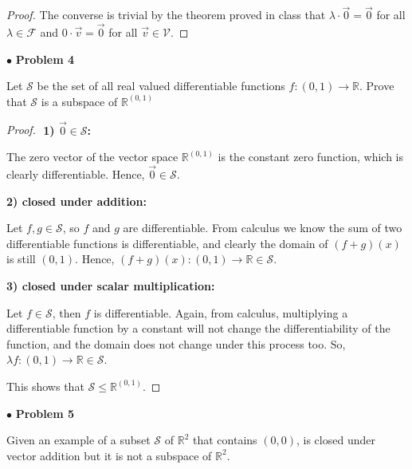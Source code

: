\documentclass{article}
\begin{document}
\begin{proof}
The converse is trivial by the theorem proved in class that $\lambda \cdot \vec{0} = \vec{0}$ for all $\lambda \in \mathcal{F}$ and $0 \cdot \vec{v} = \vec{0}$ for all $\vec{v} \in \mathcal{V}$. 

\end{proof}


\newpage
$\bullet$ \textbf{Problem 4}
\medskip

\begin{itshape}
Let $\mathcal{S}$ be the set of all real valued differentiable functions $f:(0,1) \to \mathbb{R}$. Prove that $\mathcal{S}$ is a subspace of $\mathbb{R}^{(0,1)}$
\end{itshape}
\medskip

\begin{proof}
$ $ \newline
\textbf{1) $\vec{0} \in \mathcal{S}$:}

The zero vector of the vector space $\mathbb{R}^{(0,1)}$ is the constant zero function, which is clearly differentiable. Hence, $\vec{0} \in \mathcal{S}$.
\smallskip

\textbf{2) closed under addition:}

Let $f, g \in \mathcal{S}$, so $f$ and $g$ are differentiable. From calculus we know the sum of two differentiable functions is differentiable, and clearly the domain of $(f+g)(x)$ is still $(0,1)$. Hence, $(f+g)(x): (0,1) \to \mathbb{R} \in \mathcal{S}$. 
\smallskip

\textbf{3) closed under scalar multiplication:}

Let $f \in \mathcal{S}$, then $f$ is differentiable. Again, from calculus, multiplying a differentiable function by a constant will not change the differentiability of the function, and the domain does not change under this process too. So, $\lambda f: (0,1) \to \mathbb{R} \in \mathcal{S}$.
\smallskip

This shows that $\mathcal{S} \le \mathbb{R}^{(0,1)}$. 
\end{proof}


\newpage
$\bullet$ \textbf{Problem 5}
\medskip

\begin{itshape}
Given an example of a subset $\mathcal{S}$ of $\mathbb{R}^2$ that contains $(0,0)$, is closed under vector addition but it is not a subspace of $\mathbb{R}^2$.
\end{itshape}
\medskip
\end{document}
